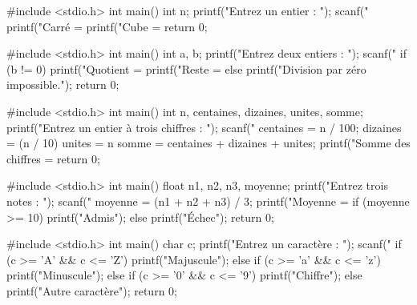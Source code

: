 \begin{ccode}
#include <stdio.h>
int main() {
    int n;
    printf("Entrez un entier : ");
    scanf("%
    printf("Carré = %
    printf("Cube = %
    return 0;
}
\end{ccode}

\begin{ccode}
#include <stdio.h>
int main() {
    int a, b;
    printf("Entrez deux entiers : ");
    scanf("%
    if (b != 0) {
        printf("Quotient = %
        printf("Reste = %
    } else {
        printf("Division par zéro impossible.\n");
    }
    return 0;
}
\end{ccode}

\begin{ccode}
#include <stdio.h>
int main() {
    int n, centaines, dizaines, unites, somme;
    printf("Entrez un entier à trois chiffres : ");
    scanf("%
    centaines = n / 100;
    dizaines = (n / 10) %
    unites = n %
    somme = centaines + dizaines + unites;
    printf("Somme des chiffres = %
    return 0;
}
\end{ccode}


\begin{ccode}
#include <stdio.h>
int main() {
    float n1, n2, n3, moyenne;
    printf("Entrez trois notes : ");
    scanf("%
    moyenne = (n1 + n2 + n3) / 3;
    printf("Moyenne = %
    if (moyenne >= 10) {
        printf("Admis\n");
    } else {
        printf("Échec\n");
    }
    return 0;
}
\end{ccode}

\begin{ccode}
#include <stdio.h>
int main() {
    char c;
    printf("Entrez un caractère : ");
    scanf(" %
    if (c >= 'A' && c <= 'Z') {
        printf("Majuscule\n");
    } else if (c >= 'a' && c <= 'z') {
        printf("Minuscule\n");
    } else if (c >= '0' && c <= '9') {
        printf("Chiffre\n");
    } else {
        printf("Autre caractère\n");
    }
    return 0;
}
\end{ccode}

